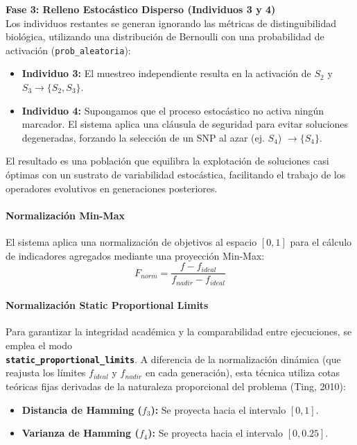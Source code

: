 \documentclass[a4paper,10pt]{article}
\begin{document}
\begin{itemize}
    \textbf{Fase 3: Relleno Estocástico Disperso (Individuos 3 y 4)} \\
    Los individuos restantes se generan ignorando las métricas de distinguibilidad biológica, utilizando una distribución de Bernoulli con una probabilidad de activación (\texttt{prob\_aleatoria}):
    \begin{itemize}
        \item \textbf{Individuo 3:} El muestreo independiente resulta en la activación de $S_2$ y $S_3 \rightarrow \{S_2, S_3\}$.
        \item \textbf{Individuo 4:} Supongamos que el proceso estocástico no activa ningún marcador. El sistema aplica una cláusula de seguridad para evitar soluciones degeneradas, forzando la selección de un SNP al azar (ej. $S_4$) $\rightarrow \{S_4\}$.
    \end{itemize}
    
    El resultado es una población que equilibra la explotación de soluciones casi óptimas con un sustrato de variabilidad estocástica, facilitando el trabajo de los operadores evolutivos en generaciones posteriores.
\end{itemize}

\paragraph{Normalización Min-Max}
El sistema aplica una normalización de objetivos al espacio $[0, 1]$ para el cálculo de indicadores agregados mediante una proyección Min-Max:
\begin{equation}
\label{eq:norm_common}
F_{norm} = \frac{f - f_{ideal}}{f_{nadir} - f_{ideal}}
\end{equation}

\paragraph{Normalización Static Proportional Limits}
Para garantizar la integridad académica y la comparabilidad entre ejecuciones, se emplea el modo \\ \mbox{\textbf{\texttt{static\_proportional\_limits}}}. A diferencia de la normalización dinámica (que reajusta los límites $f_{ideal}$ y $f_{nadir}$ en cada generación), esta técnica utiliza cotas teóricas fijas derivadas de la naturaleza proporcional del problema (Ting, 2010):

\begin{itemize}
    \item \textbf{Distancia de Hamming ($f_3$):} Se proyecta hacia el intervalo $[0, 1]$.
    \item \textbf{Varianza de Hamming ($f_4$):} Se proyecta hacia el intervalo $[0, \mbox{0.25}]$.
\end{itemize}
\end{document}
